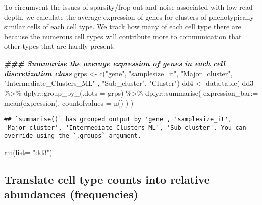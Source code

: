 \documentclass[
]{article}
\newenvironment{Shaded}{\begin{snugshade}}{\end{snugshade}}
\newcommand{\AttributeTok}[1]{\textcolor[rgb]{0.77,0.63,0.00}{#1}}
\newcommand{\DocumentationTok}[1]{\textcolor[rgb]{0.56,0.35,0.01}{\textbf{\textit{#1}}}}
\newcommand{\FunctionTok}[1]{\textcolor[rgb]{0.00,0.00,0.00}{#1}}
\newcommand{\NormalTok}[1]{#1}
\newcommand{\OtherTok}[1]{\textcolor[rgb]{0.56,0.35,0.01}{#1}}
\newcommand{\SpecialCharTok}[1]{\textcolor[rgb]{0.00,0.00,0.00}{#1}}
\newcommand{\StringTok}[1]{\textcolor[rgb]{0.31,0.60,0.02}{#1}}
\begin{document}
To circumvent the issues of sparsity/frop out and noise associated with
low read depth, we calculate the average expression of genes for
clusters of phenotypically similar cells of each cell type. We track how
many of each cell type there are because the numerous cell types will
contribute more to communication that other types that are hardly
present.

\begin{Shaded}
\begin{Highlighting}[]
\DocumentationTok{\#\#\# Summarise the average expression of genes in each cell discretization class      }
\NormalTok{grps }\OtherTok{\textless{}{-}} \FunctionTok{c}\NormalTok{(}\StringTok{"gene"}\NormalTok{, }\StringTok{"samplesize\_it"}\NormalTok{, }\StringTok{"Major\_cluster"}\NormalTok{, }\StringTok{"Intermediate\_Clusters\_ML"}\NormalTok{ , }\StringTok{"Sub\_cluster"}\NormalTok{, }\StringTok{"Cluster"}\NormalTok{)   }
\NormalTok{dd4 }\OtherTok{\textless{}{-}} \FunctionTok{data.table}\NormalTok{( dd3 }\SpecialCharTok{\%\textgreater{}\%}\NormalTok{ dplyr}\SpecialCharTok{::}\FunctionTok{group\_by\_}\NormalTok{(}\AttributeTok{.dots =}\NormalTok{ grps) }\SpecialCharTok{\%\textgreater{}\%}\NormalTok{ dplyr}\SpecialCharTok{::}\FunctionTok{summarise}\NormalTok{( }\AttributeTok{expression\_bar:=} \FunctionTok{mean}\NormalTok{(expression), }\AttributeTok{countofvalues =} \FunctionTok{n}\NormalTok{() ) )}
\end{Highlighting}
\end{Shaded}

\begin{verbatim}
## `summarise()` has grouped output by 'gene', 'samplesize_it', 'Major_cluster', 'Intermediate_Clusters_ML', 'Sub_cluster'. You can override using the `.groups` argument.
\end{verbatim}

\begin{Shaded}
\begin{Highlighting}[]
\FunctionTok{rm}\NormalTok{(}\AttributeTok{list=} \StringTok{"dd3"}\NormalTok{)}
\end{Highlighting}
\end{Shaded}

\hypertarget{translate-cell-type-counts-into-relative-abundances-frequencies}{%
\subsection{Translate cell type counts into relative abundances
(frequencies)}\label{translate-cell-type-counts-into-relative-abundances-frequencies}}
\end{document}
